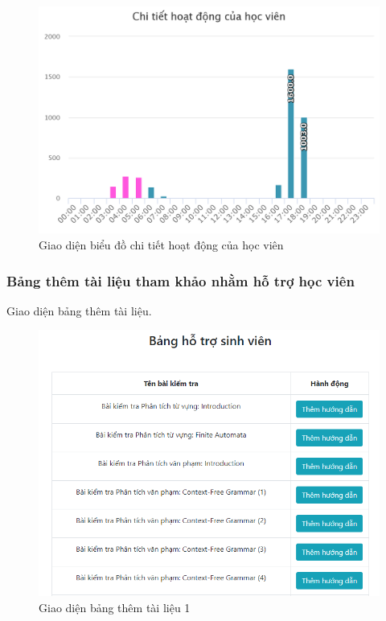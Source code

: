 \begin{center}
	\begin{figure}[htp]
		\begin{center}
			\includegraphics[width=0.8\linewidth]{img/52}
		\end{center}
		\caption{Giao diện biểu đồ chi tiết hoạt động của học viên}
		\label{refhinh92}
	\end{figure}
\end{center}

\newpage
\subsubsection*{Bảng thêm tài liệu tham khảo nhằm hỗ trợ học viên}

Giao diện bảng thêm tài liệu.

\begin{center}
	\begin{figure}[htp]
		\begin{center}
			\includegraphics[width=0.6\linewidth]{img/30}
		\end{center}
		\caption{Giao diện bảng thêm tài liệu 1}
		\label{refhinh62}
	\end{figure}
\end{center}

